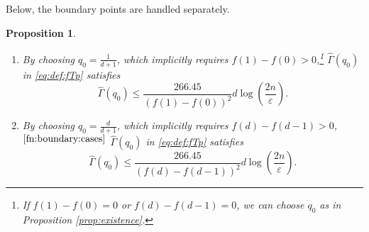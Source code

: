 \documentclass[onecolumn,letterpaper]{IEEEtran}
\newtheorem{proposition}{Proposition}
\newcommand{\cp}{{q}}
\newcommand{\ftaup}{{\hat{\Gamma}}}
\newcommand{\cpns}{\cp_0}
\newcommand{\fTpns}{\ftaup (\cpns)}
\begin{document}
Below, the boundary points are handled separately. 

\begin{proposition} 
\label{prop:existence_margin}
\begin{enumerate}
  \item  By choosing $\cpns = \frac {1} {d+1}$, which implicitly requires $f(1) - f(0)  > 0$,\footnote{\label{fn:boundary:cases}If $f(1) - f(0) =0 $ or $f(d) - f(d-1) =0$, we can  choose $\cpns$ as in Proposition \ref{prop:existence}.} $\fTpns$ in \eqref{eq:def:fTp} satisfies 
\begin{equation} 
\label{eq:existence_margin_z}
    \fTpns \le \frac{266.45}{(f(1) - f(0))^2} d \log \left( \frac{2n}{\varepsilon} \right).
\end{equation}
\item  By choosing $\cpns =\frac {d} {d+1}$, which implicitly requires $f(d) - f(d-1) > 0$,$^{\ref{fn:boundary:cases}}$ $\fTpns$ in \eqref{eq:def:fTp} satisfies  
\begin{equation} 
\label{eq:existence_margin_d}
    \fTpns \leq \frac{266.45}{(f(d) - f(d-1))^2} d \log \left( \frac{2n}{\varepsilon} \right).
\end{equation}
\end{enumerate}
\end{proposition}

\end{document}
